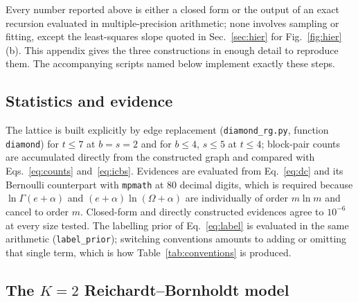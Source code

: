 \documentclass[preprint,12pt]{elsarticle}
\newcommand{\Om}{\Omega}
\begin{document}
Every number reported above is either a closed form or the output of an exact
recursion evaluated in multiple-precision arithmetic; none involves sampling or
fitting, except the least-squares slope quoted in Sec.~\ref{sec:hier} for
Fig.~\ref{fig:hier}(b). This appendix gives the three constructions in enough
detail to reproduce them. The accompanying scripts named below implement
exactly these steps.

\subsection{Statistics and evidence}
\label{app:evidence}

The lattice is built explicitly by edge replacement (\texttt{diamond\_rg.py},
function \texttt{diamond}) for $t\le7$ at $b=s=2$ and for $b\le4$, $s\le5$ at
$t\le4$; block-pair counts are accumulated directly from the constructed graph
and compared with Eqs.~\eqref{eq:counts} and~\eqref{eq:icbs}. Evidences are
evaluated from Eq.~\eqref{eq:dc} and its Bernoulli counterpart with
\texttt{mpmath} at $80$ decimal digits, which is required because
$\ln\Gamma(e{+}\alpha)$ and $(e{+}\alpha)\ln(\Om{+}\alpha)$ are individually of
order $m\ln m$ and cancel to order $m$. Closed-form and directly constructed
evidences agree to $10^{-6}$ at every size tested. The labelling prior of
Eq.~\eqref{eq:label} is evaluated in the same arithmetic
(\texttt{label\_prior}); switching conventions amounts to adding or omitting
that single term, which is how Table~\ref{tab:conventions} is produced.

\subsection{The $K=2$ Reichardt--Bornholdt model}
\label{app:rbising}
\end{document}
